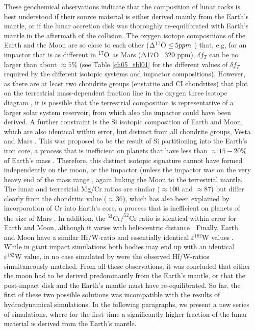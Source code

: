 These geochemical observations indicate that the composition of lunar rocks is best understood if their source material is either derived mainly from the Earth's mantle, or if the lunar accretion disk was thoroughly re-equilibrated with Earth's mantle in the aftermath of the collision. The oxygen isotope compositions of the Earth and the Moon are so close to each other ($\Delta \O17 \le 5 ppm$  \citep{Wiechert:2001p3543}) that, e.g, for an impactor that is as different in $\O17$ as Mars (Δ17O ~320 ppm), $\delta f_{T}$ can be no larger than about $\approx 5 \%$ (see Table \ref{ch05_tbl01} for the different values of $\delta f_{T}$ required by the different isotopic systems and impactor compositions). However, as there are at least two chondrite groups (enstatite and CI chondrites) that plot on the terrestrial mass-dependent fraction line in the oxygen three isotope diagram \citep{Clayton:1993p3544}, it is possible that the terrestrial composition is representative of a larger solar system reservoir, from which also the impactor could have been derived. A further constraint is the Si isotopic composition of Earth and Moon, which are also identical within error, but distinct from all chondrite groups, Vesta and Mars  \citep{2009E&PSL.287...77F, 2007Natur.447.1102G}. This was proposed to be the result of Si partitioning into the Earth's iron core, a process that is inefficient on planets that have less than $\approx 15-20\%$ of  Earth's mass \citep{2005E&PSL.236...78W}. Therefore, this distinct isotopic signature cannot have formed independently on the moon, or the impactor (unless the impactor was on the very heavy end of the mass range \citep{Canup:2004p115}, again linking the Moon to the terrestrial mantle. The lunar and terrestrial Mg/Cr ratios are similar ($\approx 100$ and $\approx 87$) but differ clearly from the chondritic value ($\approx 36$), which has also been explained by incorporation of Cr into Earth's core, a process that is inefficient on planets of the size of Mars \citep{2000orem.book..197J}. In addition, the $^{53} \textrm{Cr}/ ^{52}\textrm{Cr}$ ratio is identical within error for Earth and Moon, although it varies with heliocentric distance \citep{2000SSRv...92..225S}. Finally, Earth and Moon have a similar Hf/W-ratio and essentially identical $\varepsilon ^{182}\textrm{W}$ values \citep{2007Natur.450.1206T}. While in giant impact simulations both bodies may end up with an identical $\varepsilon ^{182}\textrm{W}$ value, in no case simulated by \cite{2010E&PSL.292..363N} were the observed Hf/W-ratios simultaneously matched. From all these observations, it was concluded \citep{2010E&PSL.292..363N, 2011E&PSL.301..433P} that either the moon had to be derived predominantly from the Earth's mantle, or that the post-impact disk and the Earth's mantle must have re-equilibrated. So far, the first of these two possible solutions was incompatible with the results of hydrodynamical simulations. In the following paragraphs, we present a new series of simulations, where for the first time a significantly higher fraction of the lunar material is derived from the Earth's mantle.

